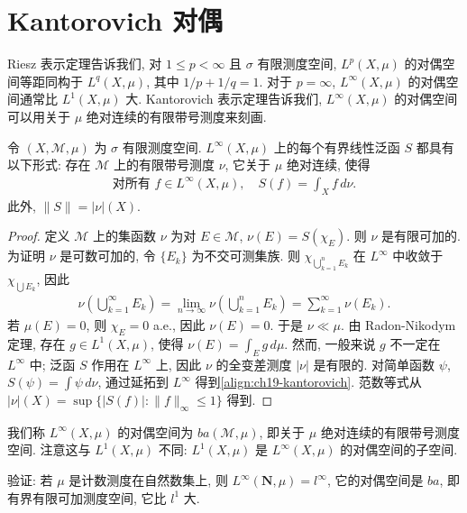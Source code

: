 \documentclass[../../main.tex]{subfiles}
\begin{document}
\section{Kantorovich 对偶}\label{section:ch19-kantorovich}

Riesz 表示定理告诉我们, 对 $1\leqslant p<\infty$ 且 $\sigma$ 有限测度空间, $L^{p}(X,\mu)$ 的对偶空间等距同构于 $L^{q}(X,\mu)$, 其中 $1/p+1/q=1$. 对于 $p=\infty$, $L^{\infty}(X,\mu)$ 的对偶空间通常比 $L^{1}(X,\mu)$ 大. Kantorovich 表示定理告诉我们, $L^{\infty}(X,\mu)$ 的对偶空间可以用关于 $\mu$ 绝对连续的有限带号测度来刻画.

\begin{theorem}\label{theorem:ch19-kantorovich}
令 $(X,\mathcal{M},\mu)$ 为 $\sigma$ 有限测度空间. $L^{\infty}(X,\mu)$ 上的每个有界线性泛函 $S$ 都具有以下形式: 存在 $\mathcal{M}$ 上的有限带号测度 $\nu$, 它关于 $\mu$ 绝对连续, 使得
\begin{align}
\text{对所有 }f\in L^{\infty}(X,\mu),\quad S(f)=\int_{X}f\,d\nu.\label{align:ch19-kantorovich}
\end{align}
此外, $\|S\|=|\nu|(X)$.
\end{theorem}

\begin{proof}
定义 $\mathcal{M}$ 上的集函数 $\nu$ 为对 $E\in\mathcal{M}$, $\nu(E)=S(\chi_{E})$. 则 $\nu$ 是有限可加的. 为证明 $\nu$ 是可数可加的, 令 $\{E_{k}\}$ 为不交可测集族. 则 $\chi_{\bigcup_{k=1}^{n}E_{k}}$ 在 $L^{\infty}$ 中收敛于 $\chi_{\bigcup E_{k}}$, 因此
\begin{align*}
\nu\left(\bigcup_{k=1}^{\infty}E_{k}\right)=\lim_{n\to\infty}\nu\left(\bigcup_{k=1}^{n}E_{k}\right)=\sum_{k=1}^{\infty}\nu(E_{k}).
\end{align*}
若 $\mu(E)=0$, 则 $\chi_{E}=0$ a.e., 因此 $\nu(E)=0$. 于是 $\nu\ll\mu$. 由 Radon-Nikodym 定理, 存在 $g\in L^{1}(X,\mu)$, 使得 $\nu(E)=\int_{E}g\,d\mu$. 然而, 一般来说 $g$ 不一定在 $L^{\infty}$ 中; 泛函 $S$ 作用在 $L^{\infty}$ 上, 因此 $\nu$ 的全变差测度 $|\nu|$ 是有限的. 对简单函数 $\psi$, $S(\psi)=\int\psi\,d\nu$, 通过延拓到 $L^{\infty}$ 得到\eqref{align:ch19-kantorovich}. 范数等式从 $|\nu|(X)=\sup\{|S(f)|:\|f\|_{\infty}\leqslant 1\}$ 得到.
\end{proof}

我们称 $L^{\infty}(X,\mu)$ 的对偶空间为 $ba(\mathcal{M},\mu)$, 即关于 $\mu$ 绝对连续的有限带号测度空间. 注意这与 $L^{1}(X,\mu)$ 不同: $L^{1}(X,\mu)$ 是 $L^{\infty}(X,\mu)$ 的对偶空间的子空间.

\begin{exercise}\label{exercise:ch19-09}
验证: 若 $\mu$ 是计数测度在自然数集上, 则 $L^{\infty}(\mathbf{N},\mu)=l^{\infty}$, 它的对偶空间是 $ba$, 即有界有限可加测度空间, 它比 $l^{1}$ 大.
\end{exercise}
\end{document}
